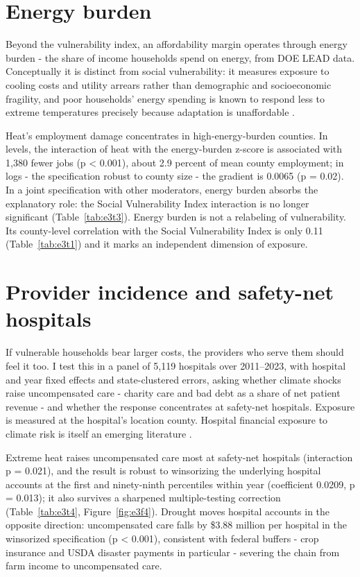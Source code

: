 \documentclass[a4paper,11pt]{report}
\begin{document}
\FloatBarrier
\section{Energy burden}

Beyond the vulnerability index, an affordability margin operates through energy burden - the share of income households spend on energy, from DOE LEAD data. Conceptually it is distinct from social vulnerability: it measures exposure to cooling costs and utility arrears rather than demographic and socioeconomic fragility, and poor households' energy spending is known to respond less to extreme temperatures precisely because adaptation is unaffordable \citep{doremus2022sweating}.

Heat's employment damage concentrates in high-energy-burden counties. In levels, the interaction of heat with the energy-burden z-score is associated with 1,380 fewer jobs (p < 0.001), about 2.9 percent of mean county employment; in logs - the specification robust to county size - the gradient is \textminus{}0.0065 (p = 0.02). In a joint specification with other moderators, energy burden absorbs the explanatory role: the Social Vulnerability Index interaction is no longer significant (Table~\ref{tab:e3t3}). Energy burden is not a relabeling of vulnerability. Its county-level correlation with the Social Vulnerability Index is only 0.11 (Table~\ref{tab:e3t1}) and it marks an independent dimension of exposure.



\FloatBarrier
\section{Provider incidence and safety-net hospitals}

If vulnerable households bear larger costs, the providers who serve them should feel it too. I test this in a panel of 5,119 hospitals over 2011--2023, with hospital and year fixed effects and state-clustered errors, asking whether climate shocks raise uncompensated care - charity care and bad debt as a share of net patient revenue - and whether the response concentrates at safety-net hospitals. Exposure is measured at the hospital's location county. Hospital financial exposure to climate risk is itself an emerging literature \citep[e.g.,][on hurricane risk and hospital finance]{audi2025hurricane}.

Extreme heat raises uncompensated care most at safety-net hospitals (interaction p = 0.021), and the result is robust to winsorizing the underlying hospital accounts at the first and ninety-ninth percentiles within year (coefficient 0.0209, p = 0.013); it also survives a sharpened multiple-testing correction (Table~\ref{tab:e3t4}, Figure~\ref{fig:e3f4}). Drought moves hospital accounts in the opposite direction: uncompensated care falls by \$3.88 million per hospital in the winsorized specification (p < 0.001), consistent with federal buffers - crop insurance and USDA disaster payments in particular - severing the chain from farm income to uncompensated care.
\end{document}
